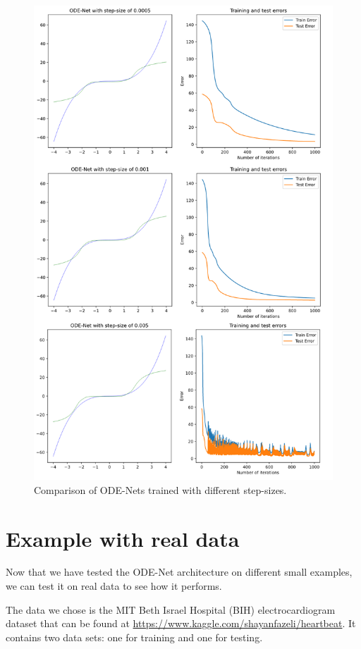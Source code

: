 \documentclass[10pt,a4paper]{article}
\theoremstyle{definition}
\theoremstyle{plain}
\begin{document}
\begin{figure}[]
\center
\includegraphics[scale=0.4]{odenet_ss.png}
\caption{Comparison of ODE-Nets trained with different step-sizes.}
\label{ode_ss}
\end{figure}

\newpage
\section{Example with real data}

Now that we have tested the ODE-Net architecture on different small examples, we can test it on real data to see how it performs. 

The data we chose is the MIT Beth Israel Hospital (BIH) electrocardiogram dataset that can be found at \url{https://www.kaggle.com/shayanfazeli/heartbeat}. It contains two data sets: one for training and one for testing.
\end{document}
